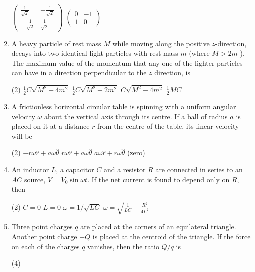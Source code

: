 \begin{enumerate}
\begin{tasks}
	\task[\textbf{c.}]$\left(\begin{array}{cc}\frac{1}{\sqrt{2}} & -\frac{1}{\sqrt{2}} \\ -\frac{1}{\sqrt{2}} & \frac{1}{\sqrt{2}}\end{array}\right)$
	\task[\textbf{d.}] $\left(\begin{array}{cc}0 & -1 \\ 1 & 0\end{array}\right)$
\end{tasks}
\item  A heavy particle of rest mass $M$ while moving along the positive $z$-direction, decays into two identical light particles with rest mass $m$ (where $M>2 m$ ). The maximum value of the momentum that any one of the lighter particles can have in a direction perpendicular to the $z$ direction, is
 \begin{tasks}(2)
	\task[\textbf{a.}] $\frac{1}{2} C \sqrt{M^{2}-4 m^{2}}$
	\task[\textbf{b.}]$\frac{1}{2} C \sqrt{M^{2}-2 m^{2}}$
	\task[\textbf{c.}] $C \sqrt{M^{2}-4 m^{2}}$
	\task[\textbf{d.}]$\frac{1}{2} M C$ 
\end{tasks}
\item A frictionless horizontal circular table is spinning with a uniform angular velocity $\omega$ about the vertical axis through its centre. If a ball of radius $a$ is placed on it at a distance $r$ from the centre of the table, its linear velocity will be
 \begin{tasks}(2)
	\task[\textbf{a.}]$-r \omega \hat{r}+a \omega \hat{\theta}$
	\task[\textbf{b.}]$r \omega \hat{r}+a \omega \hat{\theta}$
	\task[\textbf{c.}]$a \omega \hat{r}+r \omega \hat{\theta}$
	 (zero)
\end{tasks}
\item An inductor $L$, a capacitor $C$ and a resistor $R$ are connected in series to an $A C$ source, $V=V_{0} \sin \omega t$. If the net current is found to depend only on $R$, then
 \begin{tasks}(2)
	\task[\textbf{a.}]$C=0$
	\task[\textbf{b.}]$L=0$
	\task[\textbf{c.}]$\omega=1 / \sqrt{L C}$
	\task[\textbf{d.}]$\omega=\sqrt{\frac{1}{L C}-\frac{R^{2}}{4 L^{2}}}$ 
\end{tasks}
\item Three point charges $q$ are placed at the corners of an equilateral triangle. Another point charge $-Q$ is placed at the centroid of the triangle. If the force on each of the charges $q$ vanishes, then the ratio $Q / q$ is
 \begin{tasks}(4)

\end{tasks}
\end{enumerate}
